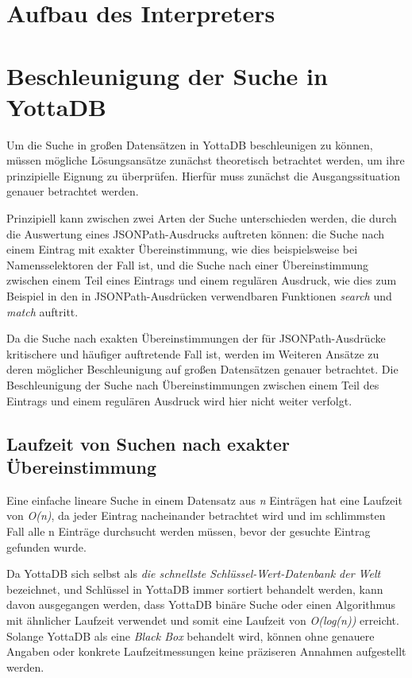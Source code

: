 \documentclass[oneside]{ausarbeitung}
\begin{document}
	
	\section{Aufbau des Interpreters}
	
	
	
	
	
	\section{Beschleunigung der Suche in YottaDB}
	
	Um die Suche in großen Datensätzen in YottaDB beschleunigen zu können, müssen mögliche Lösungsansätze zunächst theoretisch betrachtet werden, um ihre prinzipielle Eignung zu überprüfen. Hierfür muss zunächst die Ausgangssituation genauer betrachtet werden.
	
	Prinzipiell kann zwischen zwei Arten der Suche unterschieden werden, die durch die Auswertung eines JSONPath-Ausdrucks auftreten können: die Suche nach einem Eintrag mit exakter Übereinstimmung, wie dies beispielsweise bei Namensselektoren der Fall ist, und die Suche nach einer Übereinstimmung zwischen einem Teil eines Eintrags und einem regulären Ausdruck, wie dies zum Beispiel in den in JSONPath-Ausdrücken verwendbaren Funktionen \textit{search} und \textit{match} auftritt. 
	
	Da die Suche nach exakten Übereinstimmungen der für JSONPath-Ausdrücke kritischere und häufiger auftretende Fall ist, werden im Weiteren Ansätze zu deren möglicher Beschleunigung auf großen Datensätzen genauer betrachtet. Die Beschleunigung der Suche nach Übereinstimmungen zwischen einem Teil des Eintrags und einem regulären Ausdruck wird hier nicht weiter verfolgt. 
	
	
	
	\subsection{Laufzeit von Suchen nach exakter Übereinstimmung}
	
	Eine einfache lineare Suche in einem Datensatz aus \textit{n} Einträgen hat eine Laufzeit von \textit{O(n)}, da jeder Eintrag nacheinander betrachtet wird und im schlimmsten Fall alle n Einträge durchsucht werden müssen, bevor der gesuchte Eintrag gefunden wurde.
	
	Da YottaDB sich selbst als \textit{die schnellste Schlüssel-Wert-Datenbank der Welt} bezeichnet, %
	und Schlüssel in YottaDB immer sortiert behandelt werden, kann davon ausgegangen werden, dass YottaDB binäre Suche oder einen Algorithmus mit ähnlicher Laufzeit verwendet und somit eine Laufzeit von \textit{O(log(n))} erreicht. Solange YottaDB als eine \textit{Black Box} behandelt wird, können ohne genauere Angaben oder konkrete Laufzeitmessungen keine präziseren Annahmen aufgestellt werden.
	
\end{document}
